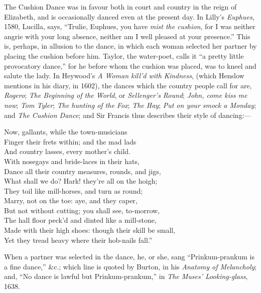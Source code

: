 
The Cushion Dance was in favour both in court and country in the reign of
Elizabeth, and is occasionally danced even at the present day. In Lilly’s \textit{Euphues},
1580, Lucilla, says, “Trulie, Euphues, you have \textit{mist the cushion}, for I was neither
angrie with your long absence, neither am I well pleased at your presence.” This
is, perhaps, in allusion to the dance, in which each woman selected her partner by
placing the cushion before him. Taylor, the water-poet, calls it “a pretty little
provocatory dance,” for he before whom the cushion was placed, was to kneel and
salute the lady. In Heywood’s \textit{A Woman kill’d with Kindness}, (which Henslow
mentions in his diary, in 1602), the dances which the country people call for are,
\textit{Rogero}; \textit{The Beginning of the World}, or \textit{Sellenger’s Round}; \textit{John, come kiss me
now}; \textit{Tom Tyler}; \textit{The hunting of the Fox}; \textit{The Hay}; \textit{Put on your smock a
Monday}; and \textit{The Cushion Dance}; and Sir Francis thus describes their style of
dancing:—
\settowidth{\versewidth}{Made with their high shoes: though their skill be small,}
\begin{scverse}
Now, gallants, while the town-musicians\\
Finger their frets within; and the mad lads\\
And country lasses, every mother’s child.\\
With nosegays and bride-laces in their hats,\\
Dance all their country measures, rounds, and jigs,\\
What shall we do? Hark! they’re all on the hoigh;\\
They toil like mill-horses, and turn as round;\\
Marry, not on the toe: aye, and they caper,\\
But not without cutting; you shall see, to-morrow,\\
The hall floor peck’d and dinted like a mill-stone,\\
Made with their high shoes: though their skill be small,\\
Yet they tread heavy where their hob-nails fall.”
\end{scverse}

When a partner was selected in the dance, he, or she, sang “Prinkum-prankum
is a fine dance,” \&c.; which line is quoted by Burton, in his \textit{Anatomy
of Melancholy}; and, “No dance is lawful but Prinkum-prankum,” in \textit{The Muses’
Looking-glass}, 1638.

